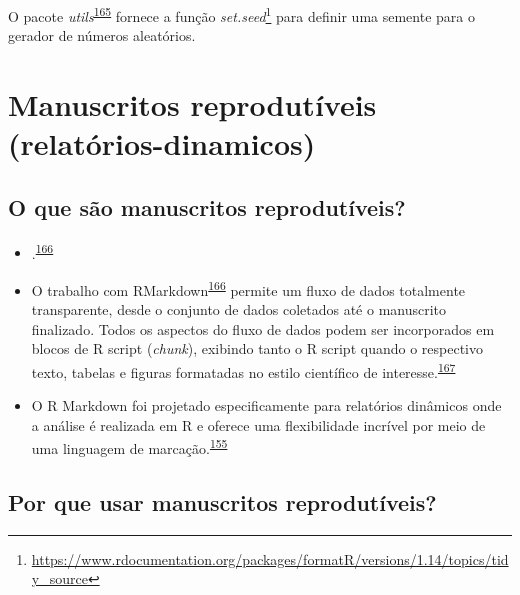 \documentclass[
]{book}
\renewcommand{\href}[2]{#2\footnote{\url{#1}}}
\newenvironment{infobox}[1]
  {
  \begin{itemize}
  \renewcommand{\labelitemi}{
    \raisebox{-.7\height}[0pt][0pt]{
      {\setkeys{Gin}{width=3em,keepaspectratio}
        \texttt{[image: \#1]}}
    }
  }
  \setlength{\fboxsep}{1em}
  \begin{blackbox}
  \item
  }
  {
  \end{blackbox}
  \end{itemize}
  }
\begin{document}
\begin{infobox}{images/Rlogo}
O pacote \emph{utils}\textsuperscript{\protect\hyperlink{ref-utils}{165}} fornece a função \href{https://www.rdocumentation.org/packages/formatR/versions/1.14/topics/tidy_source}{\emph{set.seed}} para definir uma semente para o gerador de números aleatórios.

\end{infobox}

\hypertarget{manuscritos-reprodutuxedveis-relatuxf3rios-dinamicos}{%
\section{Manuscritos reprodutíveis (relatórios-dinamicos)}\label{manuscritos-reprodutuxedveis-relatuxf3rios-dinamicos}}

\hypertarget{o-que-suxe3o-manuscritos-reprodutuxedveis}{%
\subsection{O que são manuscritos reprodutíveis?}\label{o-que-suxe3o-manuscritos-reprodutuxedveis}}

\begin{itemize}
\item
  .\textsuperscript{\protect\hyperlink{ref-R-rmarkdown}{166}}
\item
  O trabalho com RMarkdown\textsuperscript{\protect\hyperlink{ref-R-rmarkdown}{166}} permite um fluxo de dados totalmente transparente, desde o conjunto de dados coletados até o manuscrito finalizado. Todos os aspectos do fluxo de dados podem ser incorporados em blocos de R script (\emph{chunk}), exibindo tanto o R script quando o respectivo texto, tabelas e figuras formatadas no estilo científico de interesse.\textsuperscript{\protect\hyperlink{ref-holmes2021}{167}}
\item
  O R Markdown foi projetado especificamente para relatórios dinâmicos onde a análise é realizada em R e oferece uma flexibilidade incrível por meio de uma linguagem de marcação.\textsuperscript{\protect\hyperlink{ref-mair2016}{155}}
\end{itemize}

\hypertarget{por-que-usar-manuscritos-reprodutuxedveis}{%
\subsection{Por que usar manuscritos reprodutíveis?}\label{por-que-usar-manuscritos-reprodutuxedveis}}
\end{document}
